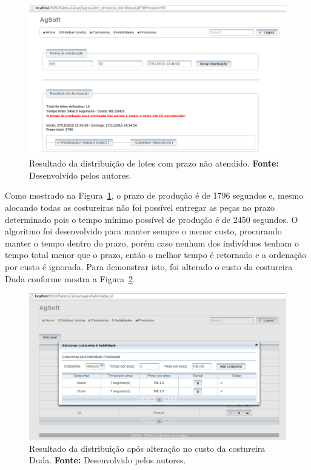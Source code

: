 \begin{figure}[h!]
	\centerline{\includegraphics[scale=0.3]{./imagens/resultado1_teste6.png}}
	\caption[Resultado da distribuição de lotes com prazo não atendido.] 
	{Resultado da distribuição de lotes com prazo não atendido. \textbf{Fonte:} Desenvolvido pelos
	autores.}
	\label{fig:resultado1_teste6}
\end{figure}

\par Como mostrado na Figura~\ref{fig:resultado1_teste6}, o prazo de produção
é de 1796 segundos e, mesmo alocando todas as costureiras não foi possível
entregar as peças no prazo determinado pois o tempo mínimo possível de produção
é de 2450 segundos. O algoritmo foi desenvolvido para manter sempre o menor custo, procurando manter o tempo
dentro do prazo, porém caso nenhum dos indivíduos tenham o tempo total menor que o prazo,
então o melhor tempo é retornado e a ordenação por custo é ignorada. Para
demonstrar isto, foi alterado o custo da costureira Duda conforme mostra a Figura~\ref{fig:alterecao_custotcseis}.
 

\begin{figure}[h!]
	\centerline{\includegraphics[scale=0.3]{./imagens/alterecao_custo_teste6.png}}
	\caption[Alteração no custo das costureiras da habilidade Finalização.] 
	{Resultado da distribuição após alteração no custo da costureira Duda. \textbf{Fonte:} Desenvolvido pelos
		autores.}
	\label{fig:alterecao_custotcseis}
\end{figure}

